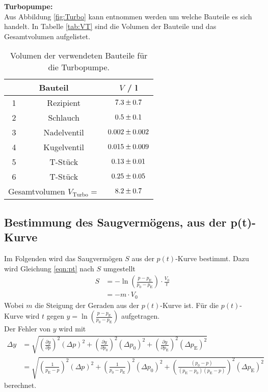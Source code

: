 \textbf{Turbopumpe:} \\
Aus Abbildung \eqref{fig:Turbo} kann entnommen werden um welche Bauteile es sich handelt. In Tabelle \eqref{tab:VT} sind die Volumen der Bauteile und das Gesamtvolumen aufgelistet.

\begin{table}[H] %
  \centering
  \caption{Volumen der verwendeten Bauteile für die Turbopumpe.}
  \label{tab:VT}
  \begin{tabular}{c|c|c}
    \multicolumn{2}{c|}{Bauteil} & $V$ / l \\
    \midrule
    1 & Rezipient & $\num{7.3 +- 0.7}$ \\
    2 & Schlauch & $\num{0.5 +- 0.1}$ \\
    3 & Nadelventil & $\num{0.002 +- 0.002}$ \\
    4 & Kugelventil & $\num{0.015 +- 0.009}$ \\
    5 & T-Stück & $\num{0.13 +- 0.01}$ \\
    6 & T-Stück & $\num{0.25 +- 0.05}$ \\
    \midrule
    \multicolumn{2}{c}{Gesamtvolumen $V_\text{Turbo} =$} & $\num{8.2 +- 0.7}$ \\
  \end{tabular}
\end{table}



\subsection{Bestimmung des Saugvermögens, aus der p(t)-Kurve}
Im Folgenden wird das Saugvermögen $S$ aus der $p(t)$-Kurve bestimmt. Dazu wird Gleichung \eqref{eqn:pt} nach $S$ umgestellt
\begin{align}
  S &= -\ln\left(\frac{p - p_\text{E}}{p_0 - p_\text{E}} \right) \cdot \frac{V_0}{t} \\
  &= -m\cdot V_0
\end{align}
Wobei $m$ die Steigung der Geraden aus der $p(t)$-Kurve ist. Für die $p(t)$-Kurve wird $t$ gegen $y = \ln\left(\frac{p - p_\text{E}}{p_0 - p_\text{E}} \right)$ aufgetragen. \\
Der Fehler von $y$ wird mit
\begin{align}
  \Delta y &= \sqrt{ \left(\frac{\partial y}{\partial p} \right)^2 (\Delta p)^2 + \left(\frac{\partial y}{\partial p_0} \right)^2 (\Delta p_0)^2 + \left(\frac{\partial y}{\partial p_\text{E}} \right)^2 (\Delta p_\text{E})^2 } \nonumber \\
  &= \sqrt{ \left(\frac{1}{p_\text{E}-p} \right)^2 (\Delta p)^2 + \left(\frac{1}{p_0-p_\text{E}} \right)^2 (\Delta p_0)^2 + \left(\frac{(p_0-p)}{(p_\text{E}-p_0)(p_\text{E}-p)} \right)^2 (\Delta p_\text{E})^2 }
\end{align}
berechnet.



